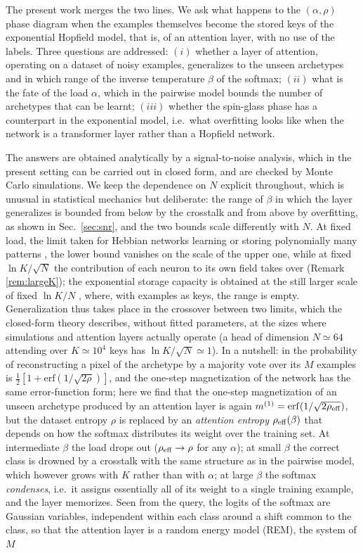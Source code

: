 \documentclass{SciPost}
\theoremstyle{plain}
\theoremstyle{definition}
\newcommand{\erf}{\mathrm{erf}}
\begin{document}
The present work merges the two lines. We ask what happens to the $(\alpha,\rho)$ phase diagram when the examples themselves become the stored keys of the exponential Hopfield model, that is, of an attention layer, with no use of the labels. Three questions are addressed: $(i)$ whether a layer of attention, operating on a dataset of noisy examples, generalizes to the unseen archetypes and in which range of the inverse temperature $\beta$ of the softmax; $(ii)$ what is the fate of the load $\alpha$, which in the pairwise model bounds the number of archetypes that can be learnt; $(iii)$ whether the spin-glass phase has a counterpart in the exponential model, i.e.\ what overfitting looks like when the network is a transformer layer rather than a Hopfield network.

The answers are obtained analytically by a signal-to-noise analysis, which in the present setting can be carried out in closed form, and are checked by Monte Carlo simulations. We keep the dependence on $N$ explicit throughout, which is unusual in statistical mechanics but deliberate: the range of $\beta$ in which the layer generalizes is bounded from below by the crosstalk and from above by overfitting, as shown in Sec.\ \ref{sec:snr}, and the two bounds scale differently with $N$. At fixed load, the limit taken for Hebbian networks learning or storing polynomially many patterns \cite{AGS1987,Alemanno2023,Agliari2023sup,Theriault2024}, the lower bound vanishes on the scale of the upper one, while at fixed $\ln K/\sqrt N$ the contribution of each neuron to its own field takes over (Remark \ref{rem:largeK}); the exponential storage capacity is obtained at the still larger scale of fixed $\ln K/N$ \cite{Demircigil2017,Lucibello2024}, where, with examples as keys, the range is empty. Generalization thus takes place in the crossover between two limits, which the closed-form theory describes, without fitted parameters, at the sizes where simulations and attention layers actually operate (a head of dimension $N\simeq64$ attending over $K\simeq10^4$ keys has $\ln K/\sqrt N\simeq1$). In a nutshell: in \cite{Alemanno2023} the probability of reconstructing a pixel of the archetype by a majority vote over its $M$ examples is $\frac12[1+\erf(1/\sqrt{2\rho})]$, and the one-step magnetization of the network has the same error-function form; here we find that the one-step magnetization of an unseen archetype produced by an attention layer is again $m^{(1)}=\erf(1/\sqrt{2\rho_{\rm eff}})$, but the dataset entropy $\rho$ is replaced by an \emph{attention entropy} $\rho_{\rm eff}(\beta)$ that depends on how the softmax distributes its weight over the training set. At intermediate $\beta$ the load drops out ($\rho_{\rm eff}\to\rho$ for any $\alpha$); at small $\beta$ the correct class is drowned by a crosstalk with the same structure as in the pairwise model, which however grows with $K$ rather than with $\alpha$; at large $\beta$ the softmax \emph{condenses}, i.e.\ it assigns essentially all of its weight to a single training example, and the layer memorizes. Seen from the query, the logits of the softmax are Gaussian variables, independent within each class around a shift common to the class, so that the attention layer is a random energy model (REM), the system of $M$ 
\end{document}
